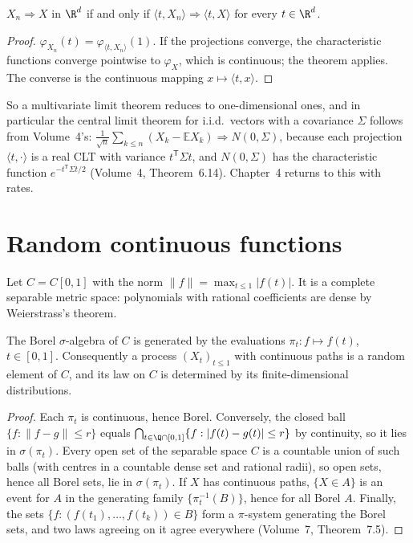 \begin{corollary}\label{cor:cramerwold}
$X_n\Rightarrow X$ in $\R^d$ if and only if $\langle t,X_n\rangle\Rightarrow\langle t,X\rangle$ for every $t\in\R^d$.
\end{corollary}
\begin{proof}
$\varphi_{X_n}(t)=\varphi_{\langle t,X_n\rangle}(1)$. If the projections converge, the characteristic functions converge pointwise to $\varphi_X$, which is
continuous; the theorem applies. The converse is the continuous mapping $x\mapsto\langle t,x\rangle$.
\end{proof}

So a multivariate limit theorem reduces to one-dimensional ones, and in particular the central limit theorem for i.i.d.\ vectors with a covariance
$\Sigma$ follows from Volume~4's: $\frac1{\sqrt n}\sum_{k\le n}(X_k-\mathbb E X_k)\Rightarrow N(0,\Sigma)$, because each projection $\langle t,\cdot\rangle$ is a real
CLT with variance $t^{\mathsf T}\Sigma t$, and $N(0,\Sigma)$ has the characteristic function $e^{-t^{\mathsf T}\Sigma t/2}$ (Volume~4, Theorem~6.14). Chapter~4
returns to this with rates.

\section{Random continuous functions}

Let $C=C[0,1]$ with the norm $\|f\|=\max_{t\le1}|f(t)|$. It is a complete separable metric space: polynomials with rational coefficients are dense by
Weierstrass's theorem.

\begin{lemma}\label{lem:cborel}
The Borel $\sigma$-algebra of $C$ is generated by the evaluations $\pi_t:f\mapsto f(t)$, $t\in[0,1]$. Consequently a process $(X_t)_{t\le1}$ with continuous paths
is a random element of $C$, and its law on $C$ is determined by its finite-dimensional distributions.
\end{lemma}
\begin{proof}
Each $\pi_t$ is continuous, hence Borel. Conversely, the closed ball $\{f:\|f-g\|\le r\}$ equals $\bigcap_{t\in\Q\cap[0,1]}\{f:|f(t)-g(t)|\le r\}$ by continuity,
so it lies in $\sigma(\pi_t)$. Every open set of the separable space $C$ is a countable union of such balls (with centres in a countable dense set and rational
radii), so open sets, hence all Borel sets, lie in $\sigma(\pi_t)$. If $X$ has continuous paths, $\{X\in A\}$ is an event for $A$ in the generating family
$\{\pi_t^{-1}(B)\}$, hence for all Borel $A$. Finally, the sets $\{f:(f(t_1),\dots,f(t_k))\in B\}$ form a $\pi$-system generating the Borel sets, and two laws
agreeing on it agree everywhere (Volume~7, Theorem~7.5).
\end{proof}

